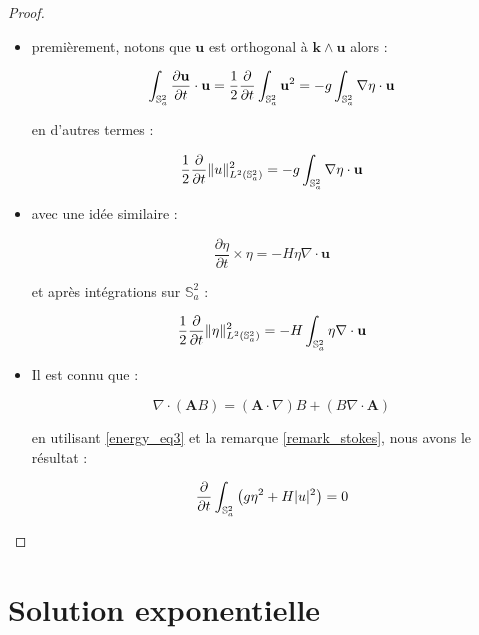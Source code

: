 \begin{proof}
\begin{itemize}
\item premièrement, notons que $\mathbf{u}$ est orthogonal à $\mathbf{k} \wedge \mathbf{u}$ alors :

$$\displaystyle\int_{\mathbb{S}_a^2} \dfrac{\partial \mathbf{u}}{\partial t} \cdot \mathbf{u} = \dfrac{1}{2} \dfrac{\partial}{\partial t} \displaystyle\int_{\mathbb{S}_a^2} \mathbf{u}^2 = -g \displaystyle\int_{\mathbb{S}_a^2} \nabla \eta \cdot \mathbf{u}$$

en d'autres termes :

\begin{equation}
\dfrac{1}{2} \dfrac{\partial}{\partial t} \| u \|_{L^2(\mathbb{S}_a^2)}^2 = -g \displaystyle\int_{\mathbb{S}_a^2} \nabla \eta \cdot \mathbf{u}
\label{energy_eq1}
\end{equation}

\item avec une idée similaire :

$$\dfrac{\partial \eta}{\partial t} \times \eta = -H \eta \nabla \cdot \mathbf{u} $$

et après intégrations sur $\mathbb{S}_a^2$ :

\begin{equation}
\dfrac{1}{2} \dfrac{\partial}{\partial t} \| \eta \|^2_{L^2(\mathbb{S}_a^2)} = -H \displaystyle\int_{\mathbb{S}_a^2} \eta \nabla \cdot \mathbf{u}
\label{energy_eq2}
\end{equation}

\item Il est connu que :

\begin{equation}
\nabla \cdot \left( \mathbf{A} B \right) = \left( \mathbf{A} \cdot \nabla \right) B + \left( B \nabla \cdot \mathbf{A} \right)
\label{energy_eq3}
\end{equation}

en utilisant \eqref{energy_eq3} et la remarque \ref{remark_stokes}, nous avons le résultat :

\begin{equation}
\dfrac{\partial}{\partial t} \displaystyle\int_{\mathbb{S}^2_a} \left( g  \eta^2 + H | u |^2 \right) = 0
\end{equation}
\end{itemize}
\end{proof}

\section{Solution exponentielle}


